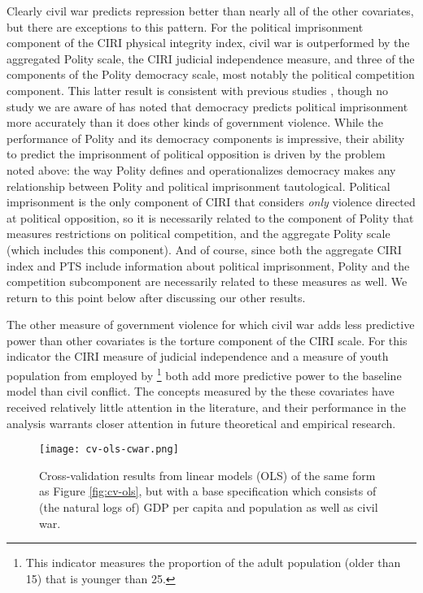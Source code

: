 \documentclass[12pt]{article}
\begin{document}
Clearly civil war predicts repression better than nearly all of the other covariates, but there are exceptions to this pattern. For the political imprisonment component of the CIRI physical integrity index, civil war is outperformed by the aggregated Polity scale, the CIRI judicial independence measure, and three of the components of the Polity democracy scale, most notably the political competition component. This latter result is consistent with previous studies \citep{Keith2002PRQ,BDMetal2005}, though no study we are aware of has noted that democracy predicts political imprisonment more accurately than it does other kinds of government violence. While the performance of Polity and its democracy components is impressive, their ability to predict the imprisonment of political opposition is driven by the problem noted above: the way Polity defines and operationalizes democracy makes any relationship between Polity and political imprisonment tautological. Political imprisonment is the only component of CIRI that considers {\em only} violence directed at political opposition, so it is necessarily related to the component of Polity that measures restrictions on political competition, and the aggregate Polity scale (which includes this component). And of course, since both the aggregate CIRI index and PTS include information about political imprisonment, Polity and the competition subcomponent are necessarily related to these measures as well. We return to this point below after discussing our other results.

The other measure of government violence for which civil war adds less predictive power than other covariates is the torture component of the CIRI scale. For this indicator the CIRI measure of judicial independence and a measure of youth population from \citet{Urdal2006} employed by \citet{NordasDavenport2013}\footnote{This indicator measures the proportion of the adult population (older than 15) that is younger than 25.} both add more predictive power to the baseline model than civil conflict. The concepts measured by the these covariates have received relatively little attention in the literature, and their performance in the analysis warrants closer attention in future theoretical and empirical research. 

\begin{figure}[!htpb]
\centering
\texttt{[image: cv-ols-cwar.png]}
\caption{Cross-validation results from linear models (OLS) of the same form as Figure \ref{fig:cv-ols}, but with a base specification which consists of (the natural logs of) GDP per capita and population as well as civil war.}
\label{fig:cv-ols-cwar}
\end{figure}
\end{document}

